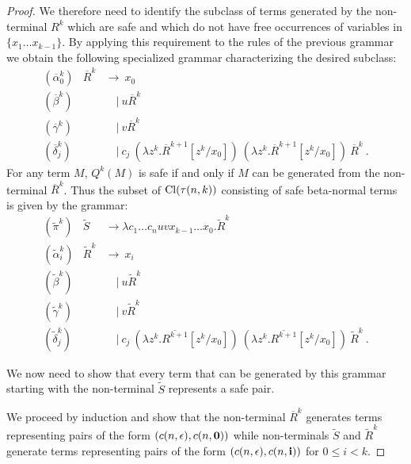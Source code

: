 \begin{proof}
We therefore need to identify the subclass of terms generated by the non-terminal $R^k$ which are safe and which do not have free occurrences of variables in $\{x_1 \ldots x_{k-1}\}$. By applying this requirement to the rules of the previous grammar we obtain the following specialized grammar characterizing the desired subclass:
\begin{eqnarray*}
  (\overline\alpha_0^k) &\overline R^k &\rightarrow\ x_0 \\
  (\overline\beta^k) && \quad|\  u \overline R^k \\
  (\overline\gamma^k) && \quad|\  v \overline R^k  \\
  (\overline\delta^k_j) && \quad|\  c_j\ (\lambda z^k. \overline R^{k+1}[z^k/x_0]) \ (\lambda z^k. \overline R^{k+1} [z^k/x_0]) \ \overline R^k \ .
\end{eqnarray*}
For any term $M$, $Q^k(M)$ is safe if and only if $M$ can be
generated from the non-terminal $\overline R^k$. Thus the subset of
${\rm Cl}(\tau(n,k))$ consisting of safe beta-normal terms is given
by the grammar:
\begin{eqnarray*}
  (\widetilde\pi^k) &\widetilde S &\rightarrow \lambda c_1 \ldots c_n u v x_{k-1} \ldots x_0 . \widetilde R^k \\
  (\widetilde\alpha_i^k) &\widetilde R^k &\rightarrow\ x_i \\
  (\widetilde\beta^k) && \quad|\  u \widetilde R^k \\
  (\widetilde\gamma^k) && \quad|\  v \widetilde R^k \\
  (\widetilde\delta^k_j) && \quad|\  c_j\ (\lambda z^k. \overline{R^{k+1}}[z^k/x_0]) \ (\lambda z^k. \overline{R^{k+1}}[z^k/x_0]) \ \widetilde R^k \ .
\end{eqnarray*}

We now need to show that every term that can be generated by this
grammar starting with the non-terminal $\widetilde S$ represents a
safe pair.

We proceed by induction and show that the non-terminal $\overline R^k$ generates terms representing pairs of the form $(c(n,\epsilon),c(n,\mathbf{0}))$
while non-terminals $\widetilde S$ and $\widetilde R^k$ generate terms representing pairs of the form $(c(n,\epsilon),c(n,\mathbf{i}))$
for $0 \leq i<k$.


\end{proof}
